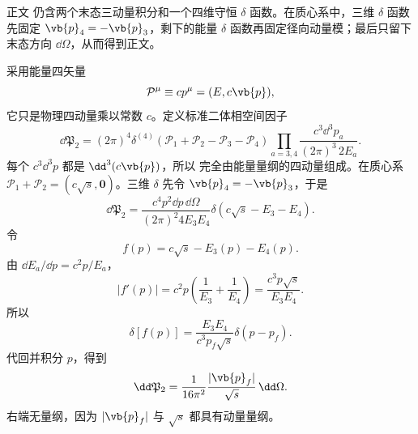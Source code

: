 \begin{derivation}[质心系中的二体相空间]
正文 仍含两个末态三动量积分和一个四维守恒 $\delta$ 函数。在质心系中，三维 $\delta$ 函数先固定 $\vb{p}_4=-\vb{p}_3$，剩下的能量 $\delta$ 函数再固定径向动量模；最后只留下末态方向 $\dd\Omega$，从而得到正文。

采用能量四矢量
\begin{equation*}
 \mathcal P^\mu\equiv cp^\mu=(E,c\vb{p}),
 \end{equation*}
它只是物理四动量乘以常数 $c$。定义标准二体相空间因子
\begin{equation*}
 \dd\mathfrak P_2
 =(2\pi)^4\delta^{(4)}(\mathcal P_1+\mathcal P_2-\mathcal P_3-\mathcal P_4)
 \prod_{a=3,4}\frac{c^3\dd^3 p_a}{(2\pi)^3\,2E_a}.
 \end{equation*}
每个 $c^3\dd^3 p$ 都是 $\dd^3(c\vb{p})$，所以  完全由能量量纲的四动量组成。在质心系 $\mathcal P_1+\mathcal P_2=(c\sqrt s,\mathbf0)$。三维 $\delta$ 先令 $\vb{p}_4=-\vb{p}_3$，于是
\begin{equation*}
 \dd\mathfrak P_2
 =\frac{c^4p^2\dd p\,\dd\Omega}{(2\pi)^2 4E_3E_4}
 \delta(c\sqrt s-E_3-E_4).
\end{equation*}
令
\begin{equation*}
 f(p)=c\sqrt s-E_3(p)-E_4(p).
\end{equation*}
由 $\dd E_a/\dd p=c^2p/E_a$，
\begin{equation*}
 \left|f'(p)\right|
 =c^2p\left(\frac1{E_3}+\frac1{E_4}\right)
 =\frac{c^3p\sqrt s}{E_3E_4}.
\end{equation*}
所以
\begin{equation*}
 \delta[f(p)]
 =\frac{E_3E_4}{c^3p_f\sqrt s}\delta(p-p_f).
\end{equation*}
代回并积分 $p$，得到
\begin{equation*}
 {
 \dd\mathfrak P_2
 =\frac1{16\pi^2}\frac{|\vb{p}_f|}{\sqrt s}\,\dd\Omega.}
 \end{equation*}
右端无量纲，因为 $|\vb{p}_f|$ 与 $\sqrt s$ 都具有动量量纲。
\end{derivation}

